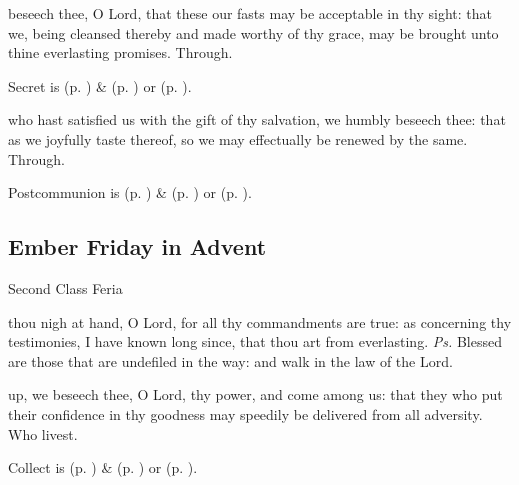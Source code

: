 
\secret
{} beseech thee, O Lord, that these our fasts may be acceptable in thy sight: that we, being cleansed thereby and made worthy of thy grace, may be brought unto thine everlasting promises. Through.
\begin{rubric}
     Secret is  (p. \pageref{SPMaryInAdvent}) \&   (p. \pageref{SPAgainst}) or  (p. \pageref{SPChiefBishop}).
\end{rubric}


\postcommunion
{} who hast satisfied us with the gift of thy salvation, we humbly beseech thee: that as we joyfully taste thereof, so we may effectually be renewed by the same. Through.
\begin{rubric}
     Postcommunion is  (p. \pageref{SPMaryInAdvent}) \&   (p. \pageref{SPAgainst}) or  (p. \pageref{SPChiefBishop}).
\end{rubric}

\clearpage
\subsection{Ember Friday in Advent}
\begin{inhead}
{Second Class Feria}
\end{inhead}


\introit
{} thou nigh at hand, O Lord, for all thy commandments are true: as concerning thy testimonies, I have known long since, that thou art from everlasting. \textit{Ps.} Blessed are those that are undefiled in the way: and walk in the law of the Lord.

\collect
{} up, we beseech thee, O Lord, thy power, and come among us: that they who put their confidence in thy goodness may speedily be delivered from all adversity. Who livest.
\begin{rubric}
     Collect is  (p. \pageref{SPMaryInAdvent}) \&   (p. \pageref{SPAgainst}) or  (p. \pageref{SPChiefBishop}).
\end{rubric}

